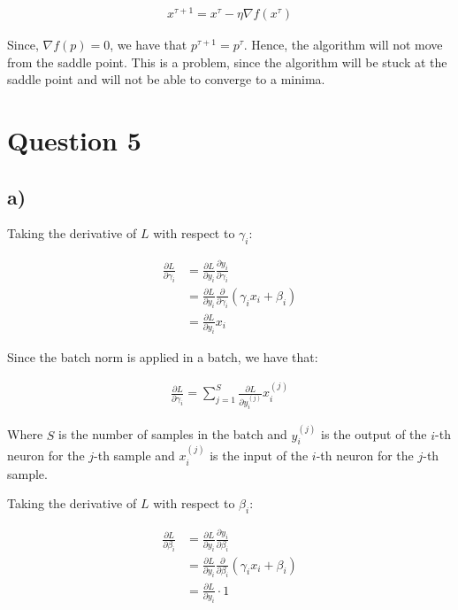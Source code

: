 \documentclass{article}
\begin{document}
\begin{align*}
    x^{\tau+1} = x^{\tau} - \eta  \nabla f(x^\tau)
\end{align*}

Since, $\nabla f(p) = 0$, we have that $p^{\tau+1} = p^{\tau}$. Hence, the algorithm will not move from the saddle point.
This is a problem, since the algorithm will be stuck at the saddle point and will not be able to converge to a minima.


\newpage
\section*{Question 5}

\subsection*{a)}

Taking the derivative of $L$ with respect to $\gamma_i$:

\begin{align*}
    \frac{\partial L}{\partial \gamma_i} &= \frac{\partial L}{\partial y_i} \frac{\partial y_i}{\partial \gamma_i} \\
    &= \frac{\partial L}{\partial y_i} \frac{\partial}{\partial \gamma_i} \left( \gamma_i x_i + \beta_i \right) \\
    &= \frac{\partial L}{\partial y_i} x_i
\end{align*}

Since the batch norm is applied in a batch, we have that: 

\begin{align*}
    \frac{\partial L}{\partial \gamma_i} = \sum_{j=1}^{S} \frac{\partial L}{\partial y_i^{(j)}} x_i^{(j)}
\end{align*}

Where $S$ is the number of samples in the batch and $y_i^{(j)}$ is the output of the $i$-th neuron for the $j$-th sample
and $x_i^{(j)}$ is the input of the $i$-th neuron for the $j$-th sample.

Taking the derivative of $L$ with respect to $\beta_i$:

\begin{align*}
    \frac{\partial L}{\partial \beta_i} &= \frac{\partial L}{\partial y_i} \frac{\partial y_i}{\partial \beta_i} \\
    &= \frac{\partial L}{\partial y_i} \frac{\partial}{\partial \beta_i} \left( \gamma_i x_i + \beta_i \right) \\
    &= \frac{\partial L}{\partial y_i} \cdot 1 \\
\end{align*}
\end{document}
